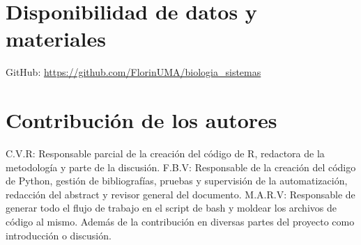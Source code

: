 \documentclass{bmcart}
\begin{document}
	\begin{backmatter}
	
		
		\section*{Disponibilidad de datos y materiales}%
			GitHub: \url{https://github.com/FlorinUMA/biologia_sistemas}
		
		\section*{Contribución de los autores}
			C.V.R: Responsable parcial de la creación del código de R, redactora de la metodología y parte de la discusión.
			F.B.V: Responsable de la creación del código de Python, gestión de bibliografías, pruebas y supervisión de la automatización, redacción del abstract y revisor general del documento.
			M.A.R.V: Responsable de generar todo el flujo de trabajo en el script de bash y moldear los archivos de código al mismo. Además de la contribución en diversas partes del proyecto como introducción o discusión.
		
		
		
	
	\end{backmatter}
\end{document}
